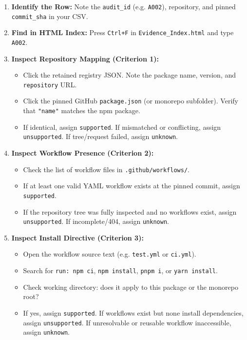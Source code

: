 \documentclass[11pt,a4paper]{article}
\begin{document}
\begin{enumerate}
  \item \textbf{Identify the Row:} Note the \nolinkurl{audit_id} (e.g. \nolinkurl{A002}), repository, and pinned \nolinkurl{commit_sha} in your CSV.
  \item \textbf{Find in HTML Index:} Press \texttt{Ctrl+F} in \nolinkurl{Evidence_Index.html} and type \nolinkurl{A002}.
  \item \textbf{Inspect Repository Mapping (Criterion 1):}
  \begin{itemize}
    \item Click the retained registry JSON. Note the package name, version, and \nolinkurl{repository} URL.
    \item Click the pinned GitHub \nolinkurl{package.json} (or monorepo subfolder). Verify that \nolinkurl{"name"} matches the npm package.
    \item If identical, assign \nolinkurl{supported}. If mismatched or conflicting, assign \nolinkurl{unsupported}. If tree/request failed, assign \nolinkurl{unknown}.
  \end{itemize}
  \item \textbf{Inspect Workflow Presence (Criterion 2):}
  \begin{itemize}
    \item Check the list of workflow files in \nolinkurl{.github/workflows/}.
    \item If at least one valid YAML workflow exists at the pinned commit, assign \nolinkurl{supported}.
    \item If the repository tree was fully inspected and no workflows exist, assign \nolinkurl{unsupported}. If incomplete/404, assign \nolinkurl{unknown}.
  \end{itemize}
  \item \textbf{Inspect Install Directive (Criterion 3):}
  \begin{itemize}
    \item Open the workflow source text (e.g. \nolinkurl{test.yml} or \nolinkurl{ci.yml}).
    \item Search for \nolinkurl{run: npm ci}, \nolinkurl{npm install}, \nolinkurl{pnpm i}, or \nolinkurl{yarn install}.
    \item Check working directory: does it apply to this package or the monorepo root?
    \item If yes, assign \nolinkurl{supported}. If workflows exist but none install dependencies, assign \nolinkurl{unsupported}. If unresolvable or reusable workflow inaccessible, assign \nolinkurl{unknown}.

\end{itemize}
\end{enumerate}
\end{document}
